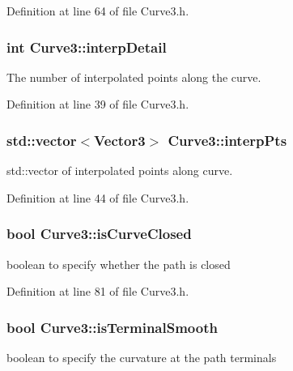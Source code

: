 Definition at line 64 of file Curve3.\-h.

\hypertarget{class_curve3_a5ab0207ec14b339175e0aa9d621d70a7}{
\subsubsection[{interp\-Detail}]{\setlength{\rightskip}{0pt plus 5cm}int Curve3\-::interp\-Detail\hspace{0.3cm}{\ttfamily [protected]}}}\label{class_curve3_a5ab0207ec14b339175e0aa9d621d70a7}
The number of interpolated points along the curve. 

Definition at line 39 of file Curve3.\-h.

\hypertarget{class_curve3_a8060ece4544b6c09dfad0ab3b27af00f}{
\subsubsection[{interp\-Pts}]{\setlength{\rightskip}{0pt plus 5cm}std\-::vector$<${\bf Vector3}$>$ Curve3\-::interp\-Pts\hspace{0.3cm}{\ttfamily [protected]}}}\label{class_curve3_a8060ece4544b6c09dfad0ab3b27af00f}
std\-::vector of interpolated points along curve. 

Definition at line 44 of file Curve3.\-h.

\hypertarget{class_curve3_a94b01af1a451e35dbcec9ef36c4b4a64}{
\subsubsection[{is\-Curve\-Closed}]{\setlength{\rightskip}{0pt plus 5cm}bool Curve3\-::is\-Curve\-Closed\hspace{0.3cm}{\ttfamily [protected]}}}\label{class_curve3_a94b01af1a451e35dbcec9ef36c4b4a64}
boolean to specify whether the path is closed 

Definition at line 81 of file Curve3.\-h.

\hypertarget{class_curve3_af842d273f3cdbb907f66ffed7b72d2a5}{
\subsubsection[{is\-Terminal\-Smooth}]{\setlength{\rightskip}{0pt plus 5cm}bool Curve3\-::is\-Terminal\-Smooth\hspace{0.3cm}{\ttfamily [protected]}}}\label{class_curve3_af842d273f3cdbb907f66ffed7b72d2a5}
boolean to specify the curvature at the path terminals 

